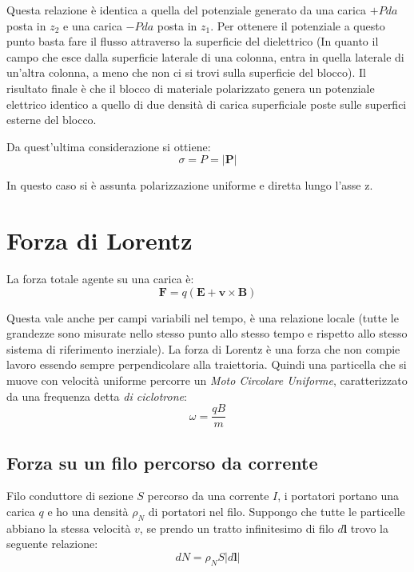 \documentclass[a4paper]{scrarticle}
\begin{document}
Questa relazione è identica  a quella del potenziale generato da una carica $+Pda$ posta in $z_2$ e una carica $-Pda$ posta in $z_1$.
Per ottenere il potenziale a questo punto basta fare il flusso attraverso la superficie del dielettrico (In quanto il campo che esce dalla superficie laterale di una colonna, entra in quella laterale di un'altra colonna, a meno che non ci si trovi sulla superficie del blocco).
Il risultato finale è che il blocco di materiale polarizzato genera un potenziale elettrico identico a quello di due densità di carica superficiale poste sulle superfici esterne del blocco.

Da quest'ultima considerazione si ottiene:
\begin{equation}
    \sigma  = P = |\bm P|
\end{equation}

In questo caso si è assunta polarizzazione uniforme e diretta lungo l'asse z.

\section{Forza di Lorentz}

La forza totale agente su una carica è:
\begin{equation}
    \bm F = q \left(\bm E + \bm v \times \bm B\right)
\end{equation}

Questa vale anche per campi variabili nel tempo, è una relazione locale (tutte le grandezze sono misurate nello stesso punto allo stesso tempo e rispetto allo stesso sistema di riferimento inerziale).
La forza di Lorentz è una forza che non compie lavoro essendo sempre perpendicolare alla traiettoria.
Quindi una particella che si muove con velocità uniforme percorre un \emph{Moto Circolare Uniforme}, caratterizzato da una frequenza detta \emph{di ciclotrone}:
\begin{equation}
    \omega = \frac{qB}{m}
\end{equation}

\subsection*{Forza su un filo percorso da corrente}

Filo conduttore di sezione $S$ percorso da una corrente $I$, i portatori portano una carica $q$ e ho una densità $\rho_N$ di portatori nel filo.
Suppongo che tutte le particelle abbiano la stessa velocità $v$, se prendo un tratto infinitesimo di filo $d\bm l $ trovo la seguente relazione:
\begin{equation*}
    dN = \rho_N S |d\bm l|
\end{equation*}
\end{document}

